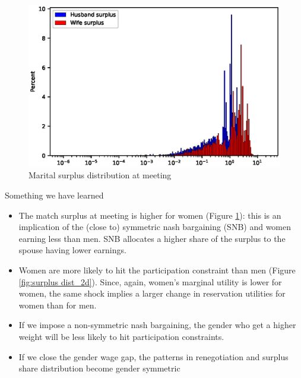 \documentclass[]{article}
\begin{document}
\begin{figure}[H]
	\centering
	\includegraphics[width=\textwidth]{surplus_dist_i_2d.eps} 
	\caption{Marital surplus distribution at meeting}
	\label{fig:surplus dist_i_2d}
\end{figure}


Something we have learned
\begin{itemize}
	\item The match surplus at meeting is higher for women (Figure \ref{fig:surplus dist_i_2d}): this is an implication of the (close to) symmetric nash bargaining (SNB) and women earning less than men. SNB allocates a higher share of the surplus to the spouse having lower earnings. 
	\item Women are more likely to hit the participation constraint than men (Figure \ref{fig:surplus dist_2d}). Since, again, women's marginal utility is lower for women, the same shock implies a larger change in reservation utilities for women than for men.
	\item If we impose a non-symmetric nash bargaining, the gender who get a higher weight will be less likely to hit participation constraints.
	\item If we close the gender wage gap, the patterns in renegotiation and surplus share distribution become gender symmetric 
\end{itemize}
\end{document}
